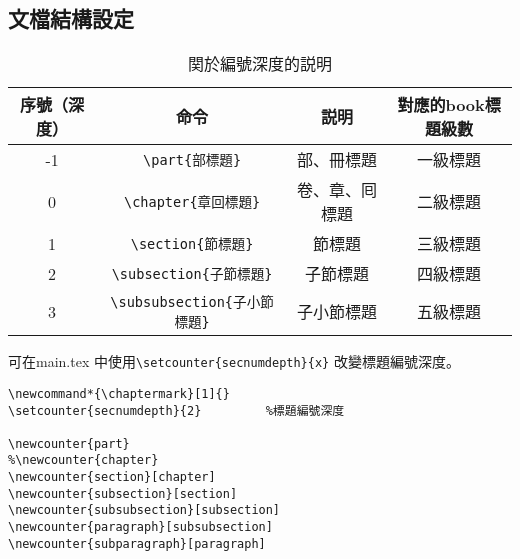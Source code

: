 %
\subsection{文檔結構設定}

\begin{table}[H]
\begin{center}
\caption{関於編號深度的説明}
\begin{tabular}{cccc}
\hline
序號（深度） & 命令& 説明 & 對應的book標題級數 \\ \hline
-1 & \verb+\part{部標題}+ & 部、冊標題 & 一級標題 \\
0 & \verb+\chapter{章回標題}+ & 卷、章、囘標題 & 二級標題  \\
1 & \verb+\section{節標題}+ & 節標題 & 三級標題 \\
2 & \verb+\subsection{子節標題}+ & 子節標題 & 四級標題 \\
3 & \verb+\subsubsection{子小節標題}+ & 子小節標題 & 五級標題 \\ \hline
\end{tabular}
\end{center}
\end{table}

\par 可在main.tex 中使用\verb+\setcounter{secnumdepth}{x}+
改變標題編號深度。
%
\begin{lstlisting}[firstnumber=885]
\newcommand*{\chaptermark}[1]{}
\setcounter{secnumdepth}{2}			%標題編號深度

\newcounter{part}
%\newcounter{chapter}
\newcounter{section}[chapter]
\newcounter{subsection}[section]
\newcounter{subsubsection}[subsection]
\newcounter{paragraph}[subsubsection]
\newcounter{subparagraph}[paragraph]
\end{lstlisting}



